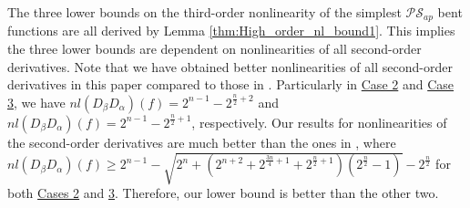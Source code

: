 \documentclass{article}
\newcommand{\0}{\textbf{0}}
\newcommand{\1}{\textbf{1}}
\theoremstyle{plain}
\begin{document}
    The three lower bounds on the third-order nonlinearity of the simplest $\mathcal{PS}_{ap}$ bent functions 
    are all derived by Lemma \ref{thm:High_order_nl_bound1}.
    This implies the three lower bounds are dependent on nonlinearities of all second-order derivatives.
    Note that we have obtained better nonlinearities of all second-order derivatives in this paper compared to those in \cite{TangCT2013NL_2bent,Carlet2011NL_Profile_Dillon}.  
    Particularly in \hyperref[case_2]{Case 2} and \hyperref[case_3]{Case 3}, we have  
     $nl(D_{\beta}D_{\alpha})(f)=2^{n-1}-2^{\frac{n}{2}+2}$ 
    and $nl(D_{\beta}D_{\alpha})(f)=2^{n-1}-2^{\frac{n}{2}+1}$, respectively.
    Our results for nonlinearities of the second-order derivatives are much better than the ones in \cite{Carlet2011NL_Profile_Dillon}, where $nl(D_{\beta}D_{\alpha})(f)\ge 2^{n-1}-\sqrt{2^n+(2^{n+2}+2^{\frac{3n}{4}+1}+2^{\frac{n}{2}+1})(2^{\frac{n}{2}}-1)}-2^{\frac{n}{2}}$ for both \hyperref[case_2]{Cases 2} and \hyperref[case_3]{3}.
    Therefore, our lower bound is better than the other two.
\end{document}
